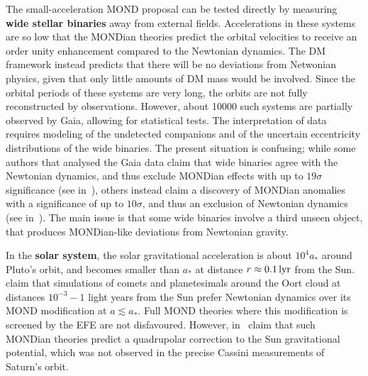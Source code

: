 \medskip

The small-acceleration MOND proposal can be tested directly by measuring 
{\bf wide stellar binaries} away from external fields.
Accelerations in these systems are so low that the MONDian theories predict the orbital
velocities to receive an order unity enhancement compared to the
Newtonian dynamics. The DM framework instead predicts that there will be no deviations from Netwonian physics, given that only little amounts of DM mass would be involved.
Since the orbital periods of these systems are very long, the orbits are not fully reconstructed by observations.
However, about 10000 such systems are partially observed by {\sc Gaia}, allowing for statistical tests.
The interpretation of data requires modeling of the undetected companions and of the uncertain
eccentricity distributions of the wide binaries.
The present situation is confusing; while some authors that analysed the {\sc Gaia} data
claim that wide binaries agree with the Newtonian dynamics, and thus
exclude MONDian effects with up to $19\sigma$ significance (see  in~\cite{MONDwidebinaries}),
others instead claim a discovery of MONDian anomalies with a significance of up to $10\sigma$, and thus
an exclusion of Newtonian dynamics (see  in~\cite{MONDwidebinaries}).
The main issue is that some wide binaries involve a third unseen object, that produces MONDian-like deviations from Newtonian gravity.


\smallskip


In the {\bf solar system}, the solar gravitational acceleration is about $10^4 a_*$ around Pluto's orbit,
and becomes smaller than $a_*$ at distance $r \approx 0.1\,{\rm lyr}$  from the Sun.
~\cite{MONDfailuresandsuccesses} 
claim that simulations of comets and planetesimals around the Oort cloud
at distances $10^{-3}-1$ light years from the Sun 
prefer Newtonian dynamics over its MOND modification at $a\lesssim a_*$. 
Full MOND theories where this modification is screened by the EFE are not disfavoured.
However,  in~\cite{MONDfailuresandsuccesses} claim that such MONDian theories predict a quadrupolar correction
to the Sun gravitational potential, which was not observed in the precise Cassini measurements of Saturn's orbit.







